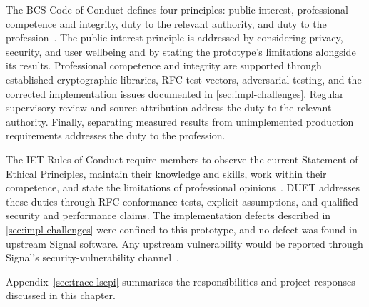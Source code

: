 The BCS Code of Conduct defines four principles: public interest, professional competence and
integrity, duty to the relevant authority, and duty to the
profession~\cite{bcs-code}. The public interest principle is addressed by considering privacy,
security, and user wellbeing and by stating the prototype's limitations alongside its results.
Professional competence and integrity are supported through established cryptographic libraries,
RFC test vectors, adversarial testing, and the corrected implementation issues documented in
\cref{sec:impl-challenges}. Regular supervisory review and source attribution address the duty to
the relevant authority. Finally, separating measured results from unimplemented production
requirements addresses the duty to the profession.

The IET Rules of Conduct require members to observe the current Statement of Ethical Principles,
maintain their knowledge and skills, work within their competence, and state the limitations of
professional opinions~\cite[Rules~2, 5, 6, and 26]{iet-conduct}. DUET addresses these duties through
RFC conformance tests, explicit assumptions, and qualified security and performance claims. The
implementation defects described in \cref{sec:impl-challenges} were confined to this prototype,
and no defect was found in upstream Signal software. Any upstream vulnerability would be reported through
Signal's security-vulnerability channel~\cite{signal-security-report}.

Appendix~\ref{sec:trace-lsepi} summarizes the responsibilities and project responses discussed in
this chapter.
